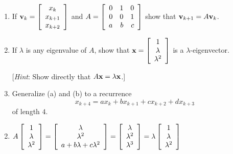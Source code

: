 \begin{multicols}{2}
\begin{ex}
\begin{enumerate}[label={\alph*.}]
\item If $\textbf{v}_k = \left[ \begin{array}{c}
x_k \\
x_{k+1} \\
x_{k+2}
\end{array}\right]$
 and $A = \left[ \begin{array}{rrr}
0 & 1 & 0 \\
0 & 0 & 1 \\
a & b & c
\end{array}\right]$
 show that $\textbf{v}_{k+1} = A\textbf{v}_{k}$.

\item If $\lambda$ is any eigenvalue of $A$, show that $\textbf{x} = \left[ \begin{array}{c}
1 \\
\lambda \\
\lambda^2
\end{array}\right]$
 is a $\lambda$-eigenvector.


[\textit{Hint}: Show directly that $A\textbf{x} = \lambda\textbf{x}$.]

\item Generalize (a) and (b) to a recurrence 
\begin{equation*}
x_{k+4} = ax_{k} + bx_{k+1} + cx_{k+2} + dx_{k+3}
\end{equation*}
of length $4$.

\end{enumerate}
\begin{sol}
\begin{enumerate}[label={\alph*.}]
\setcounter{enumi}{1}
\item  $ A \left[ \begin{array}{c}
1 \\
\lambda \\
\lambda^2 
\end{array}\right] = \left[ \begin{array}{c}
\lambda \\
\lambda^2 \\
a + b\lambda + c\lambda^2 \end{array}\right] = \left[ \begin{array}{c}
\lambda \\
\lambda^2 \\
\lambda^3 
\end{array}\right] = \lambda
\left[ \begin{array}{c}
1 \\
\lambda \\
\lambda^2 
\end{array}\right]$
\end{enumerate}
\end{sol}
\end{ex}


\end{multicols}
